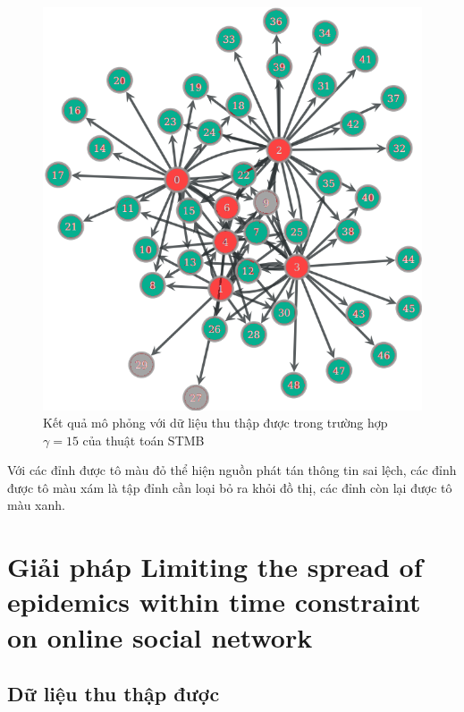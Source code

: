 \begin{itemize}
	\begin{center}
		\begin{figure}[H]
			\begin{center}
				\includegraphics [scale=.7]{picture/PartPVQ}
			\end{center}
			\caption{Kết quả mô phỏng với dữ liệu thu thập được trong trường hợp $\gamma = 15$ của thuật toán STMB}
			\label{mophong}
		\end{figure}
	\end{center}
	
	Với các đỉnh được tô màu đỏ thể hiện nguồn phát tán thông tin sai lệch, các đỉnh được tô màu xám là tập đỉnh cần loại bỏ ra khỏi đồ thị, các đỉnh còn lại được tô màu xanh.
\end{itemize}
	

	
\section{Giải pháp Limiting the spread of epidemics within time constraint on online social network}

\subsection{Dữ liệu thu thập được}

